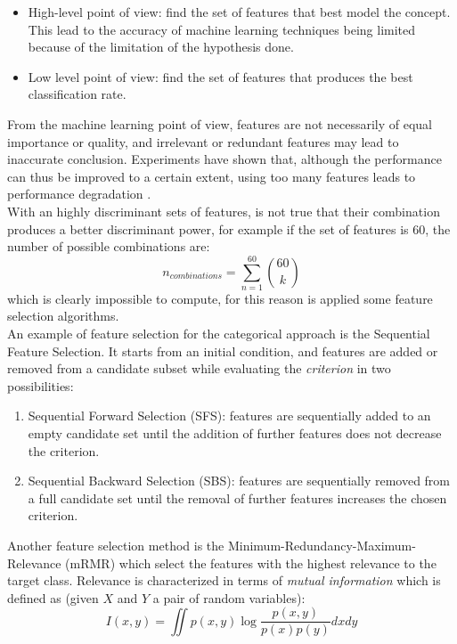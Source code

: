 \begin{itemize}
	\item High-level point of view: find the set of features that best model the concept. This lead to the accuracy of machine learning techniques being limited because of the limitation of the hypothesis done.
	\item Low level point of view: find the set of features that produces the best classification rate.
\end{itemize}
From the machine learning point of view, features are not necessarily of equal importance or quality, and irrelevant or redundant features may lead to inaccurate conclusion. Experiments have shown that, although the performance can thus be improved to a certain extent, using too many features leads to performance degradation \cite{zhang2017feature}.
\\
With an highly discriminant sets of features, is not true that their combination produces a better discriminant power, for example if the set of features is 60, the number of possible combinations are:
\begin{equation}
	n_{combinations} = \sum_{n=1}^{60} \binom{60}{k}
\end{equation}
which is clearly impossible to compute, for this reason is applied some feature selection algorithms.
\\ \indent
An example of feature selection for the categorical approach is the Sequential Feature Selection. It starts from an initial condition, and features are added or removed from a candidate subset while evaluating the \textit{criterion} in two possibilities:
\begin{enumerate}
	\item Sequential Forward Selection (SFS): features are sequentially added to an empty candidate set until the addition of further features does not decrease the criterion.
	\item Sequential Backward Selection (SBS): features are sequentially removed from a full candidate set until the removal of further features increases the chosen criterion.
\end{enumerate}
Another feature selection method is the Minimum-Redundancy-Maximum-Relevance (mRMR) which select the features with the highest relevance to the target class. Relevance is characterized in terms of \textit{mutual information} which is defined as (given $X$ and $Y$ a pair of random variables):
\begin{equation}
	I(x,y)=\iint p(x,y) \log\dfrac{p(x,y)}{p(x)p(y)} dxdy
\end{equation}
